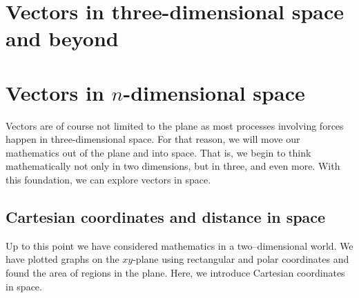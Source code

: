 %
%
%
%
%



\ifcourse

\ifcalculus
\section{Vectors in three-dimensional space and beyond}
\label{sec_vec_drie_dim}
\fi
\ifanalysis
\section{Vectors in $n$-dimensional space}
\label{sec_vec_n_dim}
\fi
Vectors are of course not limited to the plane as most processes involving forces happen in three-dimensional space. For that reason, we will move our mathematics out of the plane and into space. That is, we begin to think mathematically not only in two dimensions, but in three, and even more. With this foundation, we can explore vectors  in space. 


\subsection{Cartesian coordinates and distance in space}
Up to this point  we have considered mathematics in a two--dimensional world. We have plotted graphs on the $xy$-plane using rectangular and polar coordinates and found the area of regions in the plane. Here, we introduce Cartesian coordinates in space.

